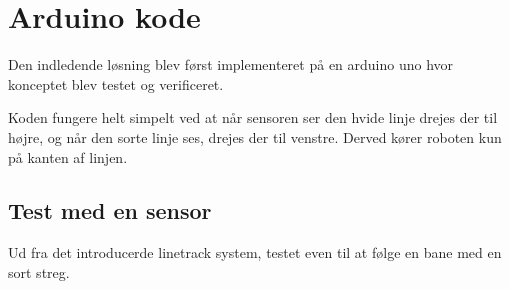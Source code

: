 \section{Arduino kode}
Den indledende løsning blev først implementeret på en arduino uno hvor konceptet blev testet og verificeret.



Koden fungere helt simpelt ved at når sensoren ser den hvide linje drejes der til højre, og når den sorte linje ses, drejes der til venstre. Derved kører roboten kun på kanten af linjen.

\subsection{Test med en sensor}
Ud fra det introducerde linetrack system, testet even til at følge en bane med en sort streg.
